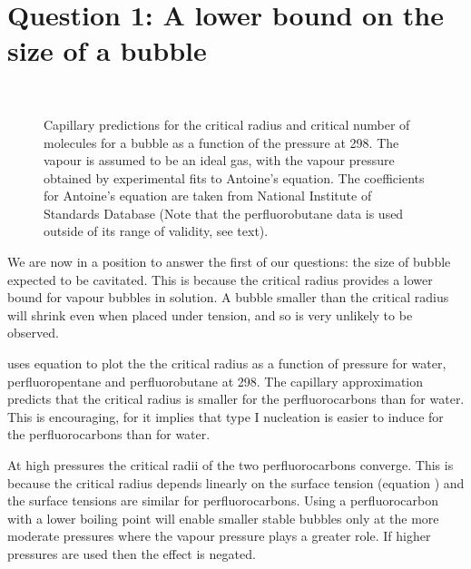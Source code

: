 \section{Question 1: A lower bound on the size of a bubble}\label{sec:nuc:evacuate}

\begin{figure}
 \centering 
  \subfloat[]{ \label{fig:cnt:criticalRadius}}\\
  \subfloat[]{\label{fig:cnt:criticalNumber}}
\caption{
    Capillary predictions for the critical radius and critical number of molecules for a bubble as a function of the pressure at \unit{298}\kelvin.  
    The vapour is assumed to be an ideal gas, with the vapour pressure obtained by experimental fits to Antoine's equation.
    The coefficients for Antoine's equation are taken from National Institute of Standards Database\cite{NISTdata}
    (Note that the perfluorobutane data is used outside of its range of validity, see text).
  }
 \label{fig:cnt:nucleation_radius}
\end{figure}

We are now in a position to answer the first of our questions: the size of bubble expected to be cavitated.
This is because the critical radius provides  a lower bound for vapour bubbles in solution.
A bubble smaller than the critical radius will shrink even when  placed under tension,
and so is very unlikely to be observed.  


 uses equation  to plot the the critical radius as a function of pressure  for water, perfluoropentane and perfluorobutane
at  \unit{298}\kelvin.
The capillary approximation predicts that the critical radius is smaller for the perfluorocarbons than for water.
This is  encouraging, for it implies that type I nucleation is easier to induce for the perfluorocarbons than for water.

At high pressures the critical radii of the two perfluorocarbons converge.
This is because the critical radius depends linearly on the surface tension (equation )
and the surface tensions are similar for perfluorocarbons.
Using a perfluorocarbon with a lower boiling point will enable smaller stable bubbles only at the more moderate  pressures where the vapour pressure plays a greater role.  
If higher pressures are used then the effect is negated.

